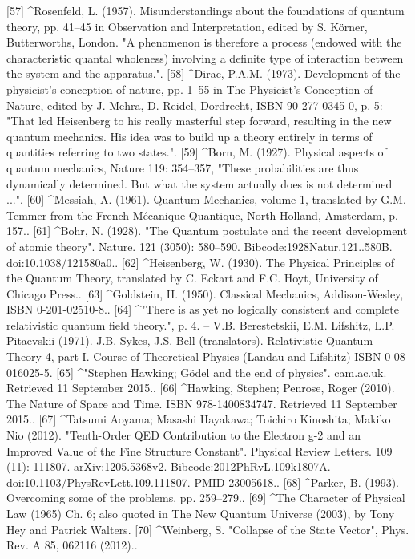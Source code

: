[57]
^Rosenfeld, L. (1957). Misunderstandings about the foundations of quantum theory, pp. 41–45 in Observation and Interpretation, edited by S. Körner, Butterworths, London. "A phenomenon is therefore a process (endowed with the characteristic quantal wholeness) involving a definite type of interaction between the system and the apparatus.".
[58]
^Dirac, P.A.M. (1973). Development of the physicist's conception of nature, pp. 1–55 in The Physicist's Conception of Nature, edited by J. Mehra, D. Reidel, Dordrecht, ISBN 90-277-0345-0, p. 5: "That led Heisenberg to his really masterful step forward, resulting in the new quantum mechanics. His idea was to build up a theory entirely in terms of quantities referring to two states.".
[59]
^Born, M. (1927). Physical aspects of quantum mechanics, Nature 119: 354–357, "These probabilities are thus dynamically determined. But what the system actually does is not determined ...".
[60]
^Messiah, A. (1961). Quantum Mechanics, volume 1, translated by G.M. Temmer from the French Mécanique Quantique, North-Holland, Amsterdam, p. 157..
[61]
^Bohr, N. (1928). "The Quantum postulate and the recent development of atomic theory". Nature. 121 (3050): 580–590. Bibcode:1928Natur.121..580B. doi:10.1038/121580a0..
[62]
^Heisenberg, W. (1930). The Physical Principles of the Quantum Theory, translated by C. Eckart and F.C. Hoyt, University of Chicago Press..
[63]
^Goldstein, H. (1950). Classical Mechanics, Addison-Wesley, ISBN 0-201-02510-8..
[64]
^"There is as yet no logically consistent and complete relativistic quantum field theory.", p. 4. – V.B. Berestetskii, E.M. Lifshitz, L.P. Pitaevskii (1971). J.B. Sykes, J.S. Bell (translators). Relativistic Quantum Theory 4, part I. Course of Theoretical Physics (Landau and Lifshitz) ISBN 0-08-016025-5.
[65]
^"Stephen Hawking; Gödel and the end of physics". cam.ac.uk. Retrieved 11 September 2015..
[66]
^Hawking, Stephen; Penrose, Roger (2010). The Nature of Space and Time. ISBN 978-1400834747. Retrieved 11 September 2015..
[67]
^Tatsumi Aoyama; Masashi Hayakawa; Toichiro Kinoshita; Makiko Nio (2012). "Tenth-Order QED Contribution to the Electron g-2 and an Improved Value of the Fine Structure Constant". Physical Review Letters. 109 (11): 111807. arXiv:1205.5368v2. Bibcode:2012PhRvL.109k1807A. doi:10.1103/PhysRevLett.109.111807. PMID 23005618..
[68]
^Parker, B. (1993). Overcoming some of the problems. pp. 259–279..
[69]
^The Character of Physical Law (1965) Ch. 6; also quoted in The New Quantum Universe (2003), by Tony Hey and Patrick Walters.
[70]
^Weinberg, S. "Collapse of the State Vector", Phys. Rev. A 85, 062116 (2012)..
